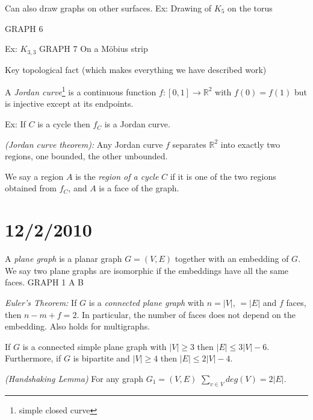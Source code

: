 \documentclass{article}
\begin{document}
\begin{rem}
Can also draw graphs on other surfaces.  Ex: Drawing of $K_5$ on the torus

GRAPH 6

Ex: $K_{3,3}$ GRAPH 7  On a M\"obius strip 
\end{rem}

Key topological fact (which makes everything we have described work)

\begin{defn}
A \emph{Jordan curve}\footnote{simple closed curve} is a continuous function $f:[0,1] \rightarrow \mathbb{R}^2$ with $f(0)=f(1)$ but is injective except at its endpoints.
\end{defn}

Ex: If $C$ is a cycle then $f_C$ is a Jordan curve.

\begin{thm}
\emph{(Jordan curve theorem):} Any Jordan curve $f$ separates $\mathbb{R}^2$ into exactly two regions, one bounded, the other unbounded.
\end{thm}

We say a region $A$ is the \emph{region of a cycle} $C$ if it is one of the two regions obtained from $f_C$, and $A$ is a face of the graph.

\section*{12/2/2010}

\begin{defn}
A \emph{plane graph} is a planar graph $G=(V,E)$ together with an embedding of $G$.   We say two plane graphs are isomorphic if the embeddings have all the same faces. GRAPH 1 A B
\end{defn}

\begin{thm}
\emph{Euler's Theorem:} If $G$ is a \emph{connected plane graph} with $n=|V|$, $=|E|$ and $f$ faces, then $n-m+f=2$.  In particular, the number of faces does not depend on the embedding.  Also holds for multigraphs.
\end{thm}

\begin{thm}
\label{planegraph}
If $G$ is a connected simple plane graph with $|V| \geq 3 $ then $|E| \leq 3|V| - 6$.  Furthermore, if $G$ is bipartite and $|V| \geq 4$ then $|E| \leq 2 |V| -4$.
\end{thm}

\begin{lem}
\label{handshake}
\emph{(Handshaking Lemma)} For any graph $G_1=(V,E)$ $\displaystyle \sum_{v \in V} deg(V) = 2|E|$.
\end{lem}
\end{document}

